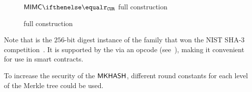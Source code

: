\begin{figure*}[ht]
    \begin{minipage}[t]{0.5\textwidth}
        \centering
    \end{minipage}%
    \begin{minipage}[t]{0.5\textwidth}
        \centering
    \end{minipage}%
    \caption{$\mimcPrime{\rCURVE}$ full construction}\label{instantiation:fig:mimcp-construction}
\end{figure*}

\begin{figure*}[ht]
    \centering
    \begin{minipage}[t]{0.5\textwidth}
        \procedure{$\mimcMPPrime{\rCURVE}(\key, \msg)$}{
            \pcreturn \mimcPrime{\rCURVE}(\key, \msg) + \msg + \key \pmod{\rCURVE}
        }
    \caption{\mimcMPPrime{\rCURVE} full construction}\label{instantiation:fig:mimcp-mp-construction}
    \end{minipage}%
\end{figure*}

\begin{remark}
    Note that  is the $256$-bit digest instance of the \keccak{} family that won the NIST SHA-3 competition~\cite{keccak-submission}. It is supported by the \evm via an opcode (see~\cite[Appendix G]{wood2014ethereum}), making it convenient for use in smart contracts.
\end{remark}

\begin{remark}
    To increase the security of the $\mathsf{\mathsf{MKHASH}}$, different round constants for each level of the Merkle tree could be used.
\end{remark}

